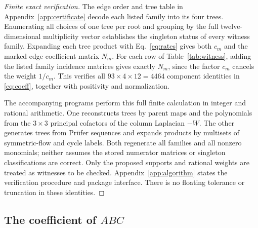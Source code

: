 \documentclass[11pt,a4paper]{article}
\begin{document}
\begin{proof}[Finite exact verification]
The edge order and tree table in Appendix~\ref{app:certificate} decode
each listed family into its four trees. Enumerating all choices of one
tree per root and grouping by the full twelve-dimensional multiplicity
vector establishes the singleton status of every witness family.
Expanding each tree product with Eq.~\eqref{eq:rates} gives both $c_m$
and the marked-edge coefficient matrix $N_m$. For each row of
Table~\ref{tab:witness}, adding the listed family incidence matrices
gives exactly $N_m$, since the factor $c_m$ cancels the weight $1/c_m$.
This verifies all $93\times4\times12=4464$ component identities in
\eqref{eq:coeff}, together with positivity and normalization.

The accompanying programs perform this full finite calculation in
integer and rational arithmetic. One reconstructs trees by parent maps
and the polynomials from the $3\times3$ principal cofactors of the
column Laplacian $-W$. The other generates trees from Pr\"ufer sequences
and expands products by multisets of symmetric-flow and cycle labels.
Both regenerate all families and all nonzero monomials; neither assumes
the stored numerator matrices or singleton classifications are correct.
Only the proposed supports and rational weights are treated as witnesses
to be checked. Appendix~\ref{app:algorithm} states the verification
procedure and package interface. There is no floating tolerance or
truncation in these identities.
\end{proof}

\subsection{The coefficient of \texorpdfstring{$ABC$}{ABC}}
\end{document}
